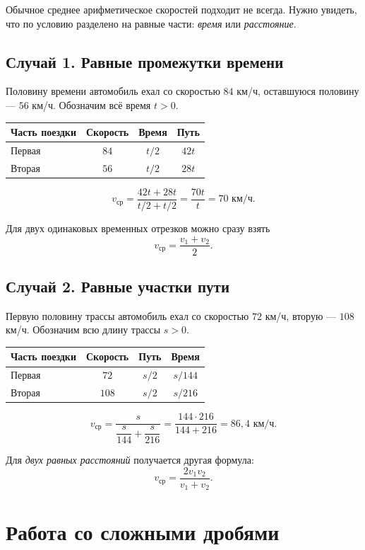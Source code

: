 \documentclass[a4paper,12pt]{article}
\begin{document}
Обычное среднее арифметическое скоростей подходит не всегда. Нужно увидеть, что по условию разделено на равные части: \emph{время} или \emph{расстояние}.

\subsection{Случай 1. Равные промежутки времени}

Половину времени автомобиль ехал со скоростью $84$ км/ч, оставшуюся половину --- $56$ км/ч. Обозначим всё время $t>0$.
\begin{center}
\renewcommand{\arraystretch}{1.22}
\begin{tabular}{@{}lccc@{}}
\toprule
Часть поездки & Скорость & Время & Путь\\
\midrule
Первая & $84$ & $t/2$ & $42t$\\
Вторая & $56$ & $t/2$ & $28t$\\
\bottomrule
\end{tabular}
\end{center}
\[
 v_{\text{ср}}=\frac{42t+28t}{t/2+t/2}
 =\frac{70t}{t}=\boxed{70\text{ км/ч}}.
\]

Для двух одинаковых временных отрезков можно сразу взять
\[
\boxed{v_{\text{ср}}=\frac{v_1+v_2}{2}}.
\]

\subsection{Случай 2. Равные участки пути}

Первую половину трассы автомобиль ехал со скоростью $72$ км/ч, вторую --- $108$ км/ч. Обозначим всю длину трассы $s>0$.
\begin{center}
\renewcommand{\arraystretch}{1.22}
\begin{tabular}{@{}lccc@{}}
\toprule
Часть поездки & Скорость & Путь & Время\\
\midrule
Первая & $72$ & $s/2$ & $s/144$\\
Вторая & $108$ & $s/2$ & $s/216$\\
\bottomrule
\end{tabular}
\end{center}
\[
 v_{\text{ср}}=\frac{s}{\dfrac{s}{144}+\dfrac{s}{216}}
 =\frac{144\cdot216}{144+216}
 =\boxed{86{,}4\text{ км/ч}}.
\]

Для \emph{двух равных расстояний} получается другая формула:
\[
\boxed{v_{\text{ср}}=\frac{2v_1v_2}{v_1+v_2}}.
\]

\section{Работа со сложными дробями}
\end{document}
